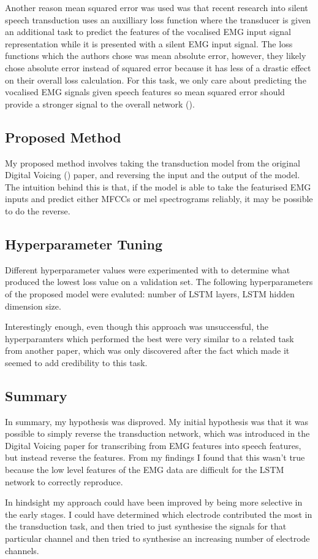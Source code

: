 Another
reason mean squared error was used was that recent research into
silent speech transduction uses an auxilliary loss function where the
transducer is given an additional task to predict the features of
the vocalised EMG input signal representation while it is presented
with a silent EMG input signal. The loss functions which the authors
chose was mean absolute error, however, they likely chose absolute
error instead of squared error because it has less of a drastic
effect on their overall loss calculation. For this task, we only
care about predicting the vocalised EMG signals given speech features
so mean squared error should provide a stronger signal to the overall
network (\cite{silent_speech_tonal}).

\subsection{Proposed Method}

My proposed method involves taking the transduction model from
the original Digital Voicing (\cite{gaddy2020digital}) paper,
and reversing the input and the output of the model. The intuition
behind this is that, if the model is able to take the featurised
EMG inputs and predict either MFCCs or mel spectrograms reliably,
it may be possible to do the reverse.

\subsection{Hyperparameter Tuning}

Different hyperparameter values were experimented with to determine what
produced the lowest loss value on a validation set. The following
hyperparameters of the proposed model were evaluted:
number of LSTM layers, LSTM hidden dimension size.

Interestingly enough, even though this approach was unsuccessful,
the hyperparamters which performed the best were very similar to
a related task from another paper, which was only discovered after the
fact which made it seemed to add credibility to this task.

\subsection{Summary}

In summary, my hypothesis was disproved.
My initial hypothesis was that it was possible to simply reverse the
transduction network, which was introduced in the Digital Voicing paper
for transcribing from EMG features into speech features, but instead
reverse the features.
From my findings I found that this wasn't true because the low level 
features of the EMG data are difficult for the LSTM network to correctly
reproduce.

In hindsight my approach could have been improved by being more selective in
the early stages. I could have determined which electrode contributed the most
in the transduction task, and then tried to just synthesise the signals for that 
particular channel and then tried to synthesise an increasing number of
electrode channels.
